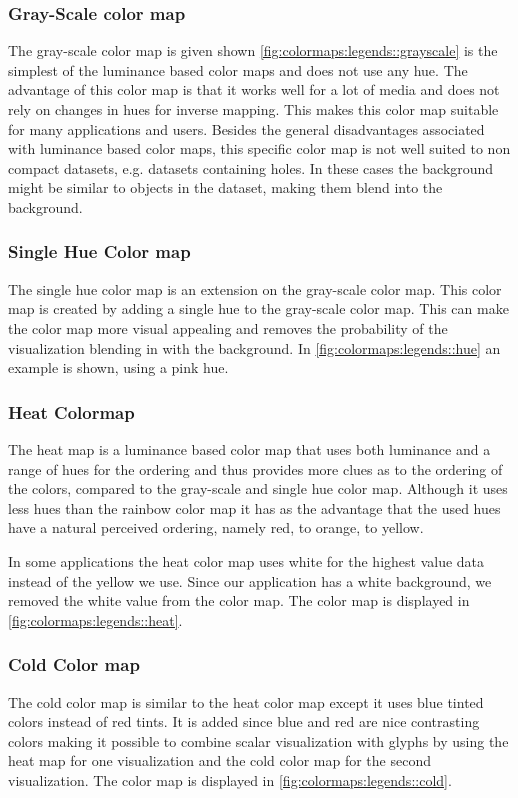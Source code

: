 \subsubsection{Gray-Scale color map} %
\label{ssub:gray_scale_colormap}
The gray-scale color map is given shown \cref{fig:colormaps:legends::grayscale} is the simplest of the luminance based color maps and does not use any hue. The advantage of this color map is that it works well for a lot of media and does not rely on changes in hues for inverse mapping. This makes this color map suitable for many applications and users. Besides the general disadvantages associated with luminance based color maps, this specific color map is not well suited to non compact datasets, e.g. datasets containing holes. In these cases the background might be similar to objects in the dataset, making them blend into the background.


\subsubsection{Single Hue Color map} %
\label{ssub:single_hue_colormap}
The single hue color map is an extension on the gray-scale color map. This color map is created by adding a single hue to the gray-scale color map. This can make the color map more visual appealing and removes the probability of the visualization blending in with the background. In \cref{fig:colormaps:legends::hue} an example is shown, using a pink hue.

\subsubsection{Heat Colormap} %
\label{sub:heat__colormap}
The heat map is a luminance based color map that uses both luminance and a range of hues for the ordering and thus provides more clues as to the ordering of the colors, compared to the gray-scale and single hue color map. Although it uses less hues than the rainbow color map it has as the advantage that the used hues have a natural perceived ordering, namely red, to orange, to yellow.

In some applications the heat color map uses white for the highest value data instead of the yellow we use. Since our application has a white background, we removed the white value from the color map. The color map is displayed in \cref{fig:colormaps:legends::heat}.


\subsubsection{Cold Color map} %
\label{ssub:cold_colormap}
The cold color map is similar to the heat color map except it uses blue tinted colors instead of red tints. It is added since blue and red are nice contrasting colors making it possible to combine scalar visualization with glyphs by using the heat map for one visualization and the cold color map for the second visualization. The color map is displayed in \cref{fig:colormaps:legends::cold}.

